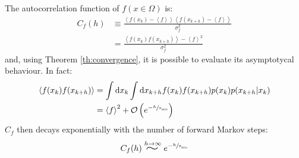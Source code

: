 The autocorrelation function of $f(x\in\Omega)$ is:
\begin{align*}
    C_f(h) &\equiv \frac{\left<f(x_k)-\left<f\right>\right>\left<f(x_{k+h})-\left<f\right>\right>}{\sigma_f^2} \\
           &= \frac{\left<f(x_k)f(x_{k+h})\right>-\left<f\right>^2}{\sigma_f^2}
\end{align*}
and, using Theorem \ref{th:convergence}, it is possible to evaluate its asymptotycal behaviour.
In fact:
\begin{align*}
    \left<f(x_k)f(x_{k+h})\right> &= \int\mathrm dx_k\int\mathrm dx_{k+h}f(x_k)f(x_{k+h})p(x_k)p(x_{k+h}|x_k) \\
                                  &= \left<f\right>^2 + \mathcal O\left(e^{-\sfrac{h}{\tau_\mathrm{mix}}}\right)
\end{align*}
$C_f$ then decays exponentially with the number of forward Markov steps:
\begin{equation}\label{eq:autocorr_decay}
    C_f(h) \stackrel{h\to\infty}{\scalebox{2}[1.25]{$\sim$}} e^{-\sfrac{h}{\tau_\mathrm{mix}}}
\end{equation}

